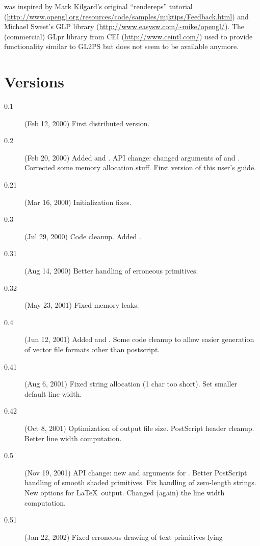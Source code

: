  was inspired by Mark Kilgard's original ``rendereps'' tutorial
(\url{http://www.opengl.org/resources/code/samples/mjktips/Feedback.html})
and Michael Sweet's GLP library (\url{http://www.easysw.com/~mike/opengl/}).
The (commercial) GLpr library from CEI (\url{http://www.ceintl.com/}) used
to provide functionality similar to GL2PS but does not seem to be available
anymore.


\section{Versions}

\begin{description}
\item[0.1] (Feb 12, 2000) First distributed version.
\item[0.2] (Feb 20, 2000) Added  and
  . API change: changed arguments of 
  and . Corrected some memory allocation stuff. First version
  of this user's guide.
\item[0.21] (Mar 16, 2000) Initialization fixes.
\item[0.3] (Jul 29, 2000) Code cleanup. Added .
\item[0.31] (Aug 14, 2000) Better handling of erroneous primitives.
\item[0.32] (May 23, 2001) Fixed memory leaks.
\item[0.4] (Jun 12, 2001) Added  and
  . Some code cleanup to allow easier generation of
  vector file formats other than postscript.
\item[0.41] (Aug 6, 2001) Fixed string allocation (1 char too short). Set
  smaller default line width.
\item[0.42] (Oct 8, 2001) Optimization of output file size. PostScript
  header cleanup. Better line width computation.
\item[0.5] (Nov 19, 2001) API change: new  and 
  arguments for . Better PostScript handling of smooth
  shaded primitives. Fix handling of zero-length strings. New options for
  \LaTeX\ output. Changed (again) the line width computation.
\item[0.51] (Jan 22, 2002) Fixed erroneous drawing of text primitives lying

\end{description}
